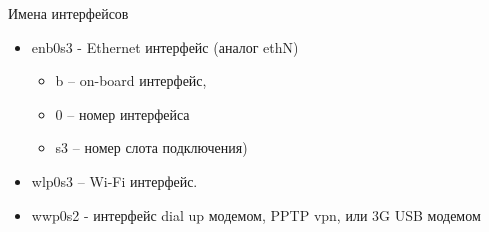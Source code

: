 \begin{frame}{Имена интерфейсов}
	\begin{itemize}
		\item enb0s3 - Ethernet интерфейс (аналог ethN)
		\begin{itemize}
			\item b – on-board интерфейс,
			\item 0 – номер интерфейса
			\item s3 – номер слота подключения)
		\end{itemize}
		\item wlp0s3 – Wi-Fi интерфейс.
		\item wwp0s2 - интерфейс dial up модемом, PPTP vpn, или 3G USB модемом
	\end{itemize}
\end{frame}


